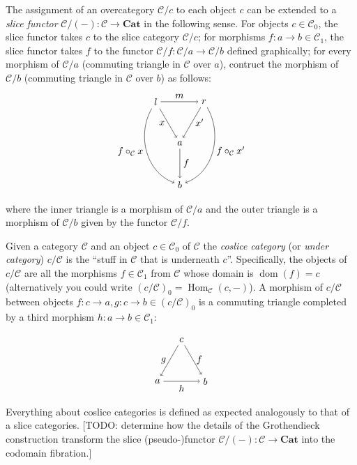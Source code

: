 \documentclass[10pt]{article}
\theoremstyle{definition}
\theoremstyle{remark}
\DeclareMathOperator{\Hom}{Hom}
\DeclareMathOperator{\dom}{dom}
\newcommand{\catC}{\mathcal{C}}
\begin{document}
The assignment of an overcategory $\catC/c$ to each object $c$ can be extended to a \textit{slice functor} $\catC / (-) : \catC \to \mathbf{Cat}$ in the following sense. For objects $c \in \catC_0$, the slice functor takes $c$ to the slice category $\catC/c$; for morphisms $f : a \to b \in \catC_1$, the slice functor takes $f$ to the functor $\catC / f : \catC / a \to \catC / b$ defined graphically; for every morphism of $\catC / a$ (commuting triangle in $\catC$ over $a$), contruct the morphism of $\catC / b$ (commuting triangle in $\catC$ over $b$) as follows:
\[
    \begin{tikzpicture}
            \draw (150:1) node(tl){$l$};
            \draw ( 30:1) node(tr){$r$};
            \draw (270:1) node(bm){$a$};
            \draw (270:2.5) node(bb){$b$};

            \draw[->] (tl) to node[below,left ]{$x$}  (bm);
            \draw[->] (tr) to node[below,right]{$x'$} (bm);
            \draw[->] (tl) to[out=-120, in=+160] node[below,left ]{$f \circ_{\catC} x$}  (bb);
            \draw[->] (tr) to[out= -60, in= +20] node[below,right]{$f \circ_{\catC} x'$} (bb);
            \draw[->] (tl) to node[above]{$m$} (tr);
            \draw[->] (bm) to node[right]{$f$} (bb);
    \end{tikzpicture}
\]
where the inner triangle is a morphism of $\catC/a$ and the outer triangle is a morphism of $\catC/b$ given by the functor $\catC/f$.

Given a category $\catC$ and an object $c \in \catC_0$ of $\catC$ the \textit{coslice category} (or \textit{under category}) $c/\catC$ is the ``stuff in $\catC$ that is underneath $c$''. Specifically, the objects of $c/\catC$ are all the morphisms $f \in \catC_1$ from $\catC$ whose domain is $\dom(f) = c$ (alternatively you could write $(c/\catC)_0 = \Hom_{\catC}(c,-)$). A morphism of $c/\catC$ between objects $f : c \to a, g : c \to b \in (c/\catC)_0$ is a commuting triangle completed by a third morphism $h : a \to b \in \catC_1$:

\[
    \begin{tikzpicture}
        \draw (210:1) node(tl){$a$};
        \draw (330:1) node(tr){$b$};
        \draw ( 90:1) node(bm){$c$};

        \draw[<-] (tl) to node[below,left ]{$g$} (bm);
        \draw[<-] (tr) to node[below,right]{$f$} (bm);
        \draw[->] (tl) to node[below]{$h$} (tr);
    \end{tikzpicture}
\]
Everything about coslice categories is defined as expected analogously to that of a slice categories.
\textcolor{red!50!black}{[TODO: determine how the details of the Grothendieck construction transform the slice (pseudo-)functor $\catC / (-) : \catC \to \mathbf{Cat}$ into the codomain fibration.]}
\end{document}
